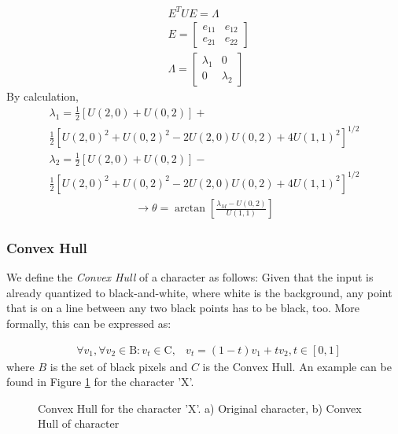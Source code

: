 \documentclass{article}
\begin{document}
\begin{align}
&E^T U E = \Lambda\\
&E=\begin{bmatrix}
 e_{11}&e_{12} \\ 
 e_{21}&e_{22} 
\end{bmatrix}
\\
&\Lambda=\begin{bmatrix}
 \lambda_1&0 \\ 
0 & \lambda_2
\end{bmatrix}
\end{align}
By calculation, 
\begin{multline}
\lambda_1=\frac{1}{2}\left[U(2,0)+U(0,2)\right] + \\ \frac{1}{2}\left[U(2,0)^2+U(0,2)^2-2U(2,0)U(0,2)+4U(1,1)^2\right]^{1/2}
\end{multline}
\begin{multline}
\lambda_2=\frac{1}{2}\left[U(2,0)+U(0,2)\right] - \\ \frac{1}{2}\left[U(2,0)^2+U(0,2)^2-2U(2,0)U(0,2)+4U(1,1)^2\right]^{1/2} 
\end{multline}
\begin{multline}
\rightarrow \theta=\arctan{\left[ \frac{\lambda_M - U(0,2)}{U(1,1)} \right] }
\end{multline}

\subsubsection{Convex Hull}
\label{sec:convexhull}

We define the \textit{Convex Hull} of a character as follows: Given that the input is already quantized to black-and-white, where white is the background, any point that is on a line between any two black points has to be black, too. More formally, this can be expressed as:

\begin{align}
&\forall v_1, \forall v_2 \in \text{B}: v_t \in \text{C},
&v_t = (1-t)v_1 + t v_2, t \in [0,1]
\end{align}
where $B$ is the set of black pixels and $C$ is the Convex Hull. An example can be found in Figure \ref{fig:convex} for the character 'X'.

\begin{figure}
 \centering
\caption{Convex Hull for the character 'X'. a) Original character, b) Convex Hull of character}
\label{fig:convex}
\end{figure}
\end{document}
